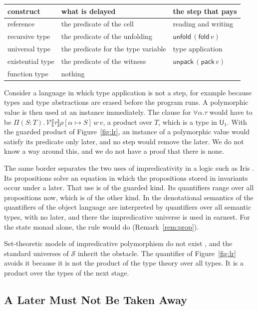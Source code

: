 \documentclass[acmsmall,nonacm,screen]{acmart}
\newcommand{\Uv}{\mathsf{U}}
\newcommand{\Tr}{\mathcal{S}}
\newcommand{\sem}[1]{\llbracket #1 \rrbracket}
\newcommand{\kw}[1]{\mathsf{#1}}
\newcommand{\Pred}{T}
\newcommand{\Vr}{\mathcal{V}}
\begin{document}
\begin{center}
\small
\begin{tabular}{@{}lll@{}}
\toprule
construct & what is delayed & the step that pays \\
\midrule
reference & the predicate of the cell & reading and writing \\
recursive type & the predicate of the unfolding & $\kw{unfold}\,(\kw{fold}\,v)$ \\
universal type & the predicate for the type variable & type application \\
existential type & the predicate of the witness & $\kw{unpack}\,(\kw{pack}\,v)$ \\
function type & nothing & \\
\bottomrule
\end{tabular}
\end{center}

Consider a language in which type application is not a step, for example because types
and type abstractions are erased before the program runs. A polymorphic value is then
used at an instance immediately. The clause for $\forall\alpha.\tau$ would have to be
$\Pi(S : \Pred).\,\Vr\sem{\tau}\rho[\alpha \mapsto S]\,w\,v$, a product over $\Pred$, which
is a type in $\Uv_1$. With the guarded product of Figure~\ref{fig:lr}, an instance of a
polymorphic value would satisfy its predicate only later, and no step would remove the
later. We do not know a way around this, and we do not have a proof that there is none.

The same border separates the two uses of impredicativity in a logic such as Iris
\citep{Iris2018}. Its propositions solve an equation in which the propositions stored in
invariants occur under a later. That use is of the guarded kind. Its quantifiers range
over all propositions now, which is of the other kind. In the denotational semantics of
\citet{SGB2022} the quantifiers of the object language are interpreted by quantifiers over
all semantic types, with no later, and there the impredicative universe is used in earnest.
For the state monad alone, the rule would do (Remark~\ref{rem:prop}).

Set-theoretic models of impredicative polymorphism do not exist \citep{Reynolds1984}, and
the standard universes of $\Tr$ inherit the obstacle. The quantifier of
Figure~\ref{fig:lr} avoids it because it is not the product of the type theory over all
types. It is a product over the types of the next stage.

\subsection{A Later Must Not Be Taken Away}\label{sec:clocks}
\end{document}
